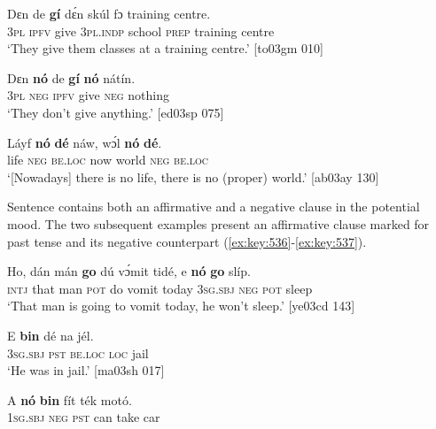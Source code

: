 \ea%
    \label{ex:key:532}
    \gll Dɛn  de  \textbf{gí}  dɛ́n    skúl    fɔ  training  centre.\\
\textsc{3pl}  \textsc{ipfv}  give  \textsc{3pl.indp}  school  \textsc{prep}  training  centre\\

\glt ‘They give them classes at a training centre.’ [to03gm 010]
\z


\ea%
    \label{ex:key:533}
    \gll Dɛn \textbf{nó} de \textbf{  gí}    \textbf{nó}  nátín.\\
\textsc{3pl} \textsc{neg} \textsc{ipfv} give \textsc{neg} nothing\\
\glt ‘They don’t give anything.’ [ed03sp 075]
\z


\ea%
    \label{ex:key:534}
    \gll Láyf    \textbf{nó}  \textbf{dé}    náw,  wɔ́l    \textbf{nó}  \textbf{dé}.\\
life    \textsc{neg}  \textsc{be.loc}  now    world  \textsc{neg}  \textsc{be.loc}\\

\glt ‘[Nowadays] there is no life, there is no (proper) world.’ [ab03ay 130]
\z

Sentence  contains both an affirmative and a negative clause in the potential mood. The two subsequent examples present an affirmative clause marked for past tense and its negative counterpart (\ref{ex:key:536}-\ref{ex:key:537}).


\ea%
    \label{ex:key:535}
    \gll Ho,  dán  mán    \textbf{go}  dú  vɔ́mit    tidé,    e    \textbf{nó}  \textbf{go}  slíp.\\
\textsc{intj}  that  man    \textsc{pot}  do  vomit    today  \textsc{3sg.sbj}  \textsc{neg}  \textsc{pot}  sleep\\

\glt ‘That man is going to vomit today, he won’t sleep.’ [ye03cd 143]
\z


\ea%
    \label{ex:key:536}
    \gll E    \textbf{bin} dé  \textbf{} na  jél.\\
\textsc{3sg.sbj}  \textsc{pst}  \textsc{be.loc}  \textsc{loc}  jail\\

\glt ‘He was in jail.’ [ma03sh 017]
\z


\ea%
    \label{ex:key:537}
    \gll A    \textbf{nó}  \textbf{bin} fít  ték    motó.\\
\textsc{1sg.sbj}  \textsc{neg}  \textsc{pst}  can  take    car\\

